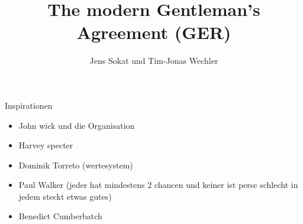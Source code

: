 \documentclass[11pt]{scrreprt}
\author{Jens Sokat und Tim-Jonas Wechler}
\title{The modern Gentleman's Agreement (GER)}
\begin{document}
\maketitle


\newpage
\tableofcontents
\newpage
Inspirationen 
\begin{itemize}
    \item John wick und die Organisation
    \item Harvey specter
    \item Dominik Torreto (wertesystem)
    \item Paul Walker (jeder hat mindestens 2 chancen und keiner ist perse schlecht in jedem steckt etwas gutes)
    \item Benedict Cumberbatch 
\end{itemize}






\end{document}
